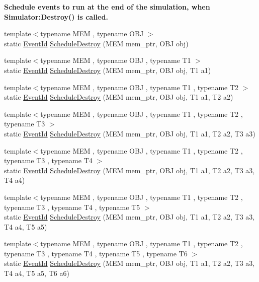 \begin{Indent}{\bf Schedule events to run at the end of the simulation, when Simulator\+:Destroy() is called.}\par
\begin{DoxyCompactItemize}
\item 
{\footnotesize template$<$typename M\+EM , typename O\+BJ $>$ }\\static \hyperlink{classns3_1_1EventId}{Event\+Id} \hyperlink{classns3_1_1Simulator_a7e1c6479e6d0bd3f0eb3e005d6941302}{Schedule\+Destroy} (M\+EM mem\+\_\+ptr, O\+BJ obj)
\item 
{\footnotesize template$<$typename M\+EM , typename O\+BJ , typename T1 $>$ }\\static \hyperlink{classns3_1_1EventId}{Event\+Id} \hyperlink{classns3_1_1Simulator_a19e3fde96e424960b43b3f571b4e738f}{Schedule\+Destroy} (M\+EM mem\+\_\+ptr, O\+BJ obj, T1 a1)
\item 
{\footnotesize template$<$typename M\+EM , typename O\+BJ , typename T1 , typename T2 $>$ }\\static \hyperlink{classns3_1_1EventId}{Event\+Id} \hyperlink{classns3_1_1Simulator_a3776691e1ceece8eb884bb022d30336b}{Schedule\+Destroy} (M\+EM mem\+\_\+ptr, O\+BJ obj, T1 a1, T2 a2)
\item 
{\footnotesize template$<$typename M\+EM , typename O\+BJ , typename T1 , typename T2 , typename T3 $>$ }\\static \hyperlink{classns3_1_1EventId}{Event\+Id} \hyperlink{classns3_1_1Simulator_ac9484e858193d199c8c9f59db9e27f6f}{Schedule\+Destroy} (M\+EM mem\+\_\+ptr, O\+BJ obj, T1 a1, T2 a2, T3 a3)
\item 
{\footnotesize template$<$typename M\+EM , typename O\+BJ , typename T1 , typename T2 , typename T3 , typename T4 $>$ }\\static \hyperlink{classns3_1_1EventId}{Event\+Id} \hyperlink{classns3_1_1Simulator_a89176b8b137de6441740d69350155eaa}{Schedule\+Destroy} (M\+EM mem\+\_\+ptr, O\+BJ obj, T1 a1, T2 a2, T3 a3, T4 a4)
\item 
{\footnotesize template$<$typename M\+EM , typename O\+BJ , typename T1 , typename T2 , typename T3 , typename T4 , typename T5 $>$ }\\static \hyperlink{classns3_1_1EventId}{Event\+Id} \hyperlink{classns3_1_1Simulator_a0c63ab395dc575c33c9e18187c0bf991}{Schedule\+Destroy} (M\+EM mem\+\_\+ptr, O\+BJ obj, T1 a1, T2 a2, T3 a3, T4 a4, T5 a5)
\item 
{\footnotesize template$<$typename M\+EM , typename O\+BJ , typename T1 , typename T2 , typename T3 , typename T4 , typename T5 , typename T6 $>$ }\\static \hyperlink{classns3_1_1EventId}{Event\+Id} \hyperlink{classns3_1_1Simulator_a2c12bb88231b9c2ea048e8a963f0275c}{Schedule\+Destroy} (M\+EM mem\+\_\+ptr, O\+BJ obj, T1 a1, T2 a2, T3 a3, T4 a4, T5 a5, T6 a6)

\end{DoxyCompactItemize}
\end{Indent}

